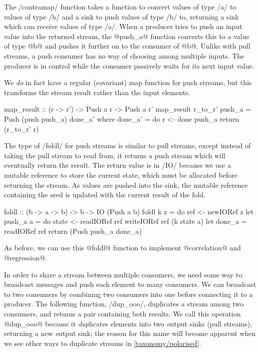 The \Hs/contramap/ function takes a function to convert values of type \Hs/a/ to values of type \Hs/b/ and a sink to push values of type \Hs/b/ to, returning a sink which can receive values of type \Hs/a/.
When a producer tries to push an input value into the returned stream, the @push_a@ function converts this to a value of type @b@ and pushes it further on to the consumer of @b@.
Unlike with pull streams, a push consumer has no way of choosing among multiple inputs.
The producer is in control while the consumer passively waits for its next input value.

We \emph{do} in fact have a regular (covariant) map function for push streams, but this transforms the stream result rather than the input elements.

\begin{haskell}
map_result :: (r -> r') -> Push a r -> Push a r'
map_result r_to_r' push_a = Push (push push_a) done_a'
 where
  done_a' = do
    r <- done push_a
    return (r_to_r' r)
\end{haskell}

The type of \Hs/foldl/ for push streams is similar to pull streams, except instead of taking the pull stream to read from, it returns a push stream which will eventually return the result.
The return value is in \Hs/IO/ because we use a mutable reference to store the current state, which must be allocated before returning the stream.
As values are pushed into the sink, the mutable reference containing the seed is updated with the current result of the fold.

\begin{haskell}
foldl :: (b -> a -> b) -> b -> IO (Push a b)
foldl k z = do
  ref <- newIORef z
  let push_a a = do
       state <- readIORef ref
       writeIORef ref (k state a)
  let done_a = readIORef ref
  return (Push push_a done_a)
\end{haskell}

As before, we can use this @foldl@ function to implement @correlation@ and @regression@.

In order to share a stream between multiple consumers, we need some way to broadcast messages and push each element to many consumers.
We can broadcast to two consumers by combining two consumers into one before connecting it to a producer.
The following function, \Hs/dup_ooo/, duplicates a stream among two consumers, and returns a pair containing both results.
We call this operation @dup_ooo@ because it \emph{dup}licates elements into two \emph{o}utput sinks (pull streams), returning a new \emph{o}utput sink; the reason for this name will become apparent when we see other ways to duplicate streams in \autoref{taxonomy/polarised}.

